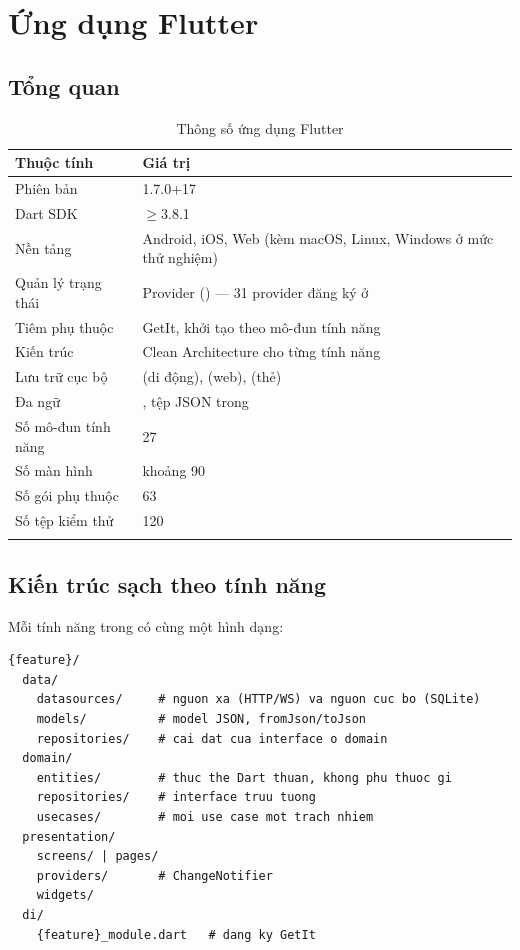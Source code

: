 \chapter{Ứng dụng Flutter}

\section{Tổng quan}

\begin{longtable}{L{4.4cm} L{9.2cm}}
\toprule
\textbf{Thuộc tính} & \textbf{Giá trị}\\
\midrule
\endhead
Phiên bản & 1.7.0+17\\
Dart SDK & \(\ge\)3.8.1\\
Nền tảng & Android, iOS, Web (kèm macOS, Linux, Windows ở mức thử nghiệm)\\
Quản lý trạng thái & Provider () — 31 provider đăng ký ở \\
Tiêm phụ thuộc & GetIt, khởi tạo theo mô-đun tính năng\\
Kiến trúc & Clean Architecture cho từng tính năng\\
Lưu trữ cục bộ &  (di động),  (web),  (thẻ)\\
Đa ngữ & , tệp JSON trong \\
Số mô-đun tính năng & 27\\
Số màn hình & khoảng 90\\
Số gói phụ thuộc & 63\\
Số tệp kiểm thử & 120\\
\bottomrule
\caption{Thông số ứng dụng Flutter}
\end{longtable}

\section{Kiến trúc sạch theo tính năng}

Mỗi tính năng trong  có cùng một hình dạng:

\begin{lstlisting}
{feature}/
  data/
    datasources/     # nguon xa (HTTP/WS) va nguon cuc bo (SQLite)
    models/          # model JSON, fromJson/toJson
    repositories/    # cai dat cua interface o domain
  domain/
    entities/        # thuc the Dart thuan, khong phu thuoc gi
    repositories/    # interface truu tuong
    usecases/        # moi use case mot trach nhiem
  presentation/
    screens/ | pages/
    providers/       # ChangeNotifier
    widgets/
  di/
    {feature}_module.dart   # dang ky GetIt
\end{lstlisting}

